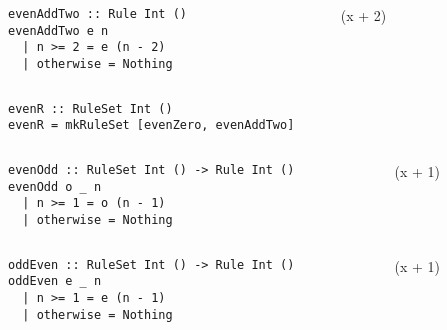 \begin{frame}[fragile]
  \begin{columns}
    \begin{column}{0.5\textwidth}
      \begin{verbatim}
evenAddTwo :: Rule Int ()
evenAddTwo e n
  | n >= 2 = e (n - 2)
  | otherwise = Nothing
      \end{verbatim}
    \end{column}
    \begin{column}{0.5\textwidth}
          {~\left(x + 2\right)}
    \end{column}
  \end{columns}
\end{frame}

\begin{frame}[fragile]
  \begin{verbatim}
evenR :: RuleSet Int ()
evenR = mkRuleSet [evenZero, evenAddTwo]
  \end{verbatim}
\end{frame}

\begin{frame}[fragile,c]
  \begin{columns}
    \begin{column}{0.5\textwidth}
  \begin{verbatim}
evenOdd :: RuleSet Int () -> Rule Int ()
evenOdd o _ n
  | n >= 1 = o (n - 1)
  | otherwise = Nothing
  \end{verbatim}
    \end{column}
    \begin{column}{0.5\textwidth}
          {~\left(x + 1\right)}
    \end{column}
  \end{columns}
\end{frame}

\begin{frame}[fragile]
  \begin{columns}
    \begin{column}{0.5\textwidth}
  \begin{verbatim}
oddEven :: RuleSet Int () -> Rule Int ()
oddEven e _ n
  | n >= 1 = e (n - 1)
  | otherwise = Nothing
  \end{verbatim}
    \end{column}
    \begin{column}{0.5\textwidth}
          {~\left(x + 1\right)}
    \end{column}
  \end{columns}
\end{frame}


